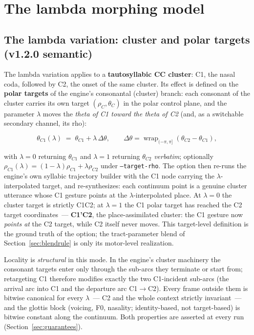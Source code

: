 \documentclass[11pt,a4paper]{article}
\newcommand{\lam}{\lambda}
\newcommand{\code}[1]{\texttt{#1}}
\newcommand{\sectref}[1]{Section~\ref{#1}}
\begin{document}
\section{The lambda morphing model}\label{sec:model}

\subsection{The lambda variation: cluster and polar targets
(v1.2.0 semantic)}\label{sec:semantic}

The lambda variation applies to a \textbf{tautosyllabic CC
cluster}: C1, the nasal coda, followed by C2, the onset of the same
cluster.  Its effect is defined on the \textbf{polar targets} of the
engine's consonantal (cluster) branch: each consonant of the cluster
carries its own target $(\rho_C, \theta_C)$ in the polar control
plane, and the parameter $\lam$ moves the \emph{theta of C1 toward
the theta of C2} (and, as a switchable secondary channel, its rho):

\begin{equation}\label{eq:target}
\theta_{C1}(\lam) \;=\; \theta_{C1} + \lam \,
\Delta\theta,
\qquad \Delta\theta = \operatorname{wrap}_{(-\pi,\pi]}\!\left(
\theta_{C2} - \theta_{C1} \right),
\end{equation}

with $\lam = 0$ returning $\theta_{C1}$ and $\lam = 1$ returning
$\theta_{C2}$ \emph{verbatim}; optionally
$\rho_{C1}(\lam) = (1-\lam)\rho_{C1} + \lam\rho_{C2}$ under
\code{--target-rho}.  The option then re-runs the engine's own
syllabic trajectory builder with the C1 node carrying the
$\lam$-interpolated target, and re-synthesizes: each continuum point
is a genuine cluster utterance whose C1 gesture points at the
$\lam$-interpolated place.  At $\lam = 0$ the cluster target is
strictly C1C2; at $\lam = 1$ the C1 polar target has reached the C2
target coordinates~--- \textbf{C1'C2}, the place-assimilated
cluster: the C1 gesture now \emph{points at} the C2 target, while C2
itself never moves.  This target-level definition is the ground
truth of the option; the tract-parameter blend of
\sectref{sec:blendrule} is only its motor-level realization.

Locality is \emph{structural} in this mode.  In the engine's
cluster machinery the consonant targets enter only through the
sub-arcs they terminate or start from; retargeting C1 therefore
modifies exactly the two C1-incident sub-arcs (the arrival arc into
C1 and the departure arc C1$\to$C2).  Every frame outside them is
bitwise canonical for every $\lam$~--- C2 and the whole context
strictly invariant~--- and the glottis block (voicing, F0,
nasality; identity-based, not target-based) is bitwise constant
along the continuum.  Both properties are asserted at every run
(\sectref{sec:guarantees}).
\end{document}
